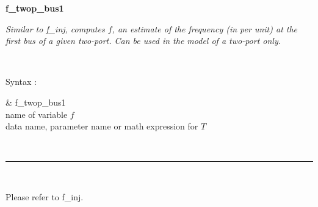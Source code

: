 \hypertarget{link_to_ftwop1}{}{\Large \bf f\_twop\_bus1}

{\it Similar to f\_inj, computes $f$, an estimate of the frequency (in per unit) at the first bus of a given two-port. Can be used in the model of a two-port only.}

~

Syntax : \hspace*{10ex}\parbox[t]{\textwidth}{\sf 
\& f\_twop\_bus1 \\
name of variable $f$\\
data name, parameter name or math expression for $T$
}

~ \hrule ~

Please refer to f\_inj.
